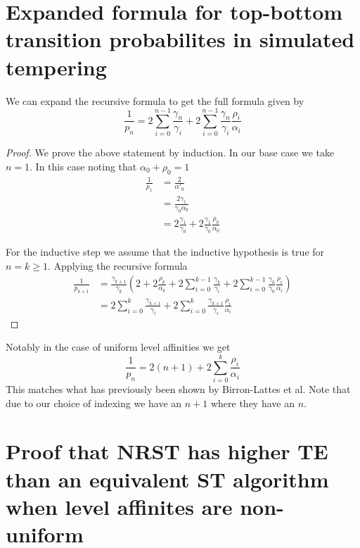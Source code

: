 \documentclass{article}
\begin{document}
\section{Expanded formula for top-bottom transition probabilites in simulated
tempering}
We can expand the recursive formula to get the full formula given by 
\[ \frac{1}{p_n} = 2\sum_{i=0}^{n-1}\frac{\gamma_n}{\gamma_i} +
2\sum_{i=0}^{n-1}\frac{\gamma_n}{\gamma_i}\frac{\rho_i}{\alpha_i}\]

\begin{proof}
    We prove the above statement by induction. In our base case we take
    $n=1$. In this case noting that $\alpha_0+\rho_0=1$
    \begin{align*}
        \frac{1}{p_1} &= \frac{2}{\alpha'_0} \\
        &= \frac{2\gamma_1}{\gamma_0\alpha_0} \\
        &= 2\frac{\gamma_1}{\gamma_0}+2\frac{\gamma_1}{\gamma_0}\frac{\rho_0}{\alpha_0}
    \end{align*}

    For the inductive step we assume that the inductive hypothesis is true
    for $n=k \geq 1$. Applying the recursive formula
    \begin{align*}
    \frac{1}{p_{k+1}} &= 
    \frac{\gamma_{k+1}}{\gamma_k}\left(2+
    2\frac{\rho_k}{\alpha_k}+
    2\sum_{i=0}^{k-1}\frac{\gamma_k}{\gamma_i} + 
    2\sum_{i=0}^{k-1}\frac{\gamma_k}{\gamma_0}\frac{\rho_i}{\alpha_i}\right) \\
    &= 2\sum_{i=0}^{k} \frac{\gamma_{k+1}}{\gamma_i} +
    2\sum_{i=0}^{k}\frac{\gamma_{k+1}}{\gamma_i}\frac{\rho_i}{\alpha_i}
    \end{align*}
\end{proof}
Notably in the case of uniform level affinities we get
\[ \frac{1}{p_n} = 2(n+1) + 2\sum_{i=0}^k \frac{\rho_i}{\alpha_i} \]
This matches what has previously been shown by Birron-Lattes et al. Note that
due to our choice of indexing we have an $n+1$ where they have an $n$.

\section{Proof that NRST has higher TE than an equivalent ST algorithm
when level affinites are non-uniform}
\end{document}
